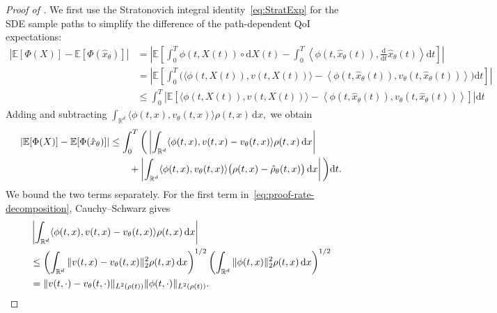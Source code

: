\documentclass[oneside,11pt]{article}
\theoremstyle{remark}
\begin{document}
\begin{proof}[Proof of ]
We first use the Stratonovich integral identity~\eqref{eq:StratExp} for the SDE sample paths to simplify the difference of the path-dependent QoI expectations:
\begin{align*}
    \left|
    \mathbb E[\Phi(X) ]
    -
    \mathbb E[\Phi(\hat{x}_\theta) ]
\right| &= \left| \mathbb{E} \left[\int_0^T \phi(t,X(t)) \circ \mathrm{d}X(t) - \int_0^T \left \langle \phi(t,\hat{x}_\theta(t)), \tfrac{\mathrm d}{\mathrm{d}t} \hat{x}_\theta(t) \right \rangle \mathrm{d}t \right] \right|\\
&= \left| \mathbb{E} \left[\int_0^T \bigg( \langle \phi(t,X(t)), v(t,X(t)) \rangle - \left \langle \phi(t,\hat{x}_\theta(t)), v_\theta(t,\hat{x}_\theta(t))\right \rangle \bigg) \mathrm{d}t \right] \right|\\
&\leq \int_0^T \left| \mathbb{E} \left[ \langle \phi(t,X(t)), v(t,X(t)) \rangle - \left \langle \phi(t,\hat{x}_\theta(t)), v_\theta(t,\hat{x}_\theta(t))\right \rangle \right] \right| \mathrm{d}t  
\end{align*}
Adding and subtracting
$
    \int_{\mathbb R^d}
    \langle \phi(t, x),v_\theta(t,x)\rangle
    \rho(t,x)\,\mathrm dx ,
$
we obtain
\begin{align}
  \left|
    \mathbb E[\Phi(X) ]
    -
    \mathbb E[\Phi(\hat{x}_\theta) ]
\right|
&\leq
\int_0^T \bigg(
\left|
    \int_{\mathbb R^d}
    \langle \phi(t,x),v(t,x)-v_\theta(t,x)\rangle
    \rho(t,x)\,\mathrm dx
\right|
\notag \\
&\qquad+
\left|
    \int_{\mathbb R^d}
    \langle \phi(t,x),v_\theta(t,x)\rangle
    \big(\rho(t,x)-\hat{\rho}_\theta(t,x)\big)\,\mathrm dx
\right| \bigg) \mathrm{d} t.
\label{eq:proof-rate-decomposition}
\end{align}
We bound the two terms separately. For the first term in~\eqref{eq:proof-rate-decomposition}, Cauchy--Schwarz gives
\begin{align*}
&
\left|
    \int_{\mathbb R^d}
    \langle \phi(t,x),v(t,x)-v_\theta(t,x)\rangle
    \rho(t,x)\,\mathrm dx
\right|
\notag \\
&\leq
\left(
    \int_{\mathbb R^d}
    \|v(t,x)-v_\theta(t,x)\|_2^2
    \rho(t,x)\,\mathrm dx
\right)^{1/2}
\left(
    \int_{\mathbb R^d}
    \|\phi(t,x)\|_2^2
    \rho(t,x)\,\mathrm dx
\right)^{1/2}
\notag \\
&=
\|v(t,\cdot)-v_\theta(t,\cdot)\|_{L^2(\rho(t))}
\|\phi(t,\cdot)\|_{L^2(\rho(t))}.
\end{align*}


\end{proof}
\end{document}
